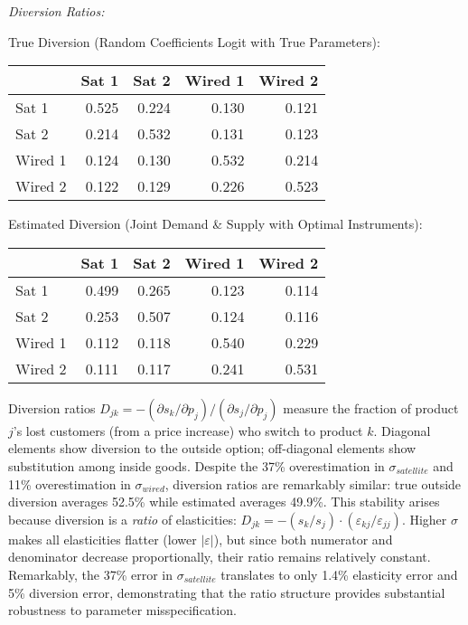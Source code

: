 \documentclass[english,11pt]{article}
\begin{document}
\begin{enumerate}
\begin{enumerate}
\textit{Diversion Ratios:}

True Diversion (Random Coefficients Logit with True Parameters):
\begin{center}
\begin{tabular}{lrrrr}
\hline
 & Sat 1 & Sat 2 & Wired 1 & Wired 2 \\
\hline
Sat 1 & 0.525 & 0.224 & 0.130 & 0.121 \\
Sat 2 & 0.214 & 0.532 & 0.131 & 0.123 \\
Wired 1 & 0.124 & 0.130 & 0.532 & 0.214 \\
Wired 2 & 0.122 & 0.129 & 0.226 & 0.523 \\
\hline
\end{tabular}
\end{center}

Estimated Diversion (Joint Demand \& Supply with Optimal Instruments):
\begin{center}
\begin{tabular}{lrrrr}
\hline
 & Sat 1 & Sat 2 & Wired 1 & Wired 2 \\
\hline
Sat 1 & 0.499 & 0.265 & 0.123 & 0.114 \\
Sat 2 & 0.253 & 0.507 & 0.124 & 0.116 \\
Wired 1 & 0.112 & 0.118 & 0.540 & 0.229 \\
Wired 2 & 0.111 & 0.117 & 0.241 & 0.531 \\
\hline
\end{tabular}
\end{center}

Diversion ratios $D_{jk} = -(\partial s_k/\partial p_j) / (\partial s_j/\partial p_j)$ measure the fraction of product $j$'s lost customers (from a price increase) who switch to product $k$. Diagonal elements show diversion to the outside option; off-diagonal elements show substitution among inside goods. Despite the 37\% overestimation in $\sigma_{satellite}$ and 11\% overestimation in $\sigma_{wired}$, diversion ratios are remarkably similar: true outside diversion averages 52.5\% while estimated averages 49.9\%. This stability arises because diversion is a \textit{ratio} of elasticities: $D_{jk} = -(s_k/s_j) \cdot (\varepsilon_{kj}/\varepsilon_{jj})$. Higher $\sigma$ makes all elasticities flatter (lower $|\varepsilon|$), but since both numerator and denominator decrease proportionally, their ratio remains relatively constant. Remarkably, the 37\% error in $\sigma_{satellite}$ translates to only 1.4\% elasticity error and 5\% diversion error, demonstrating that the ratio structure provides substantial robustness to parameter misspecification.


\end{enumerate}
\end{enumerate}
\end{document}
